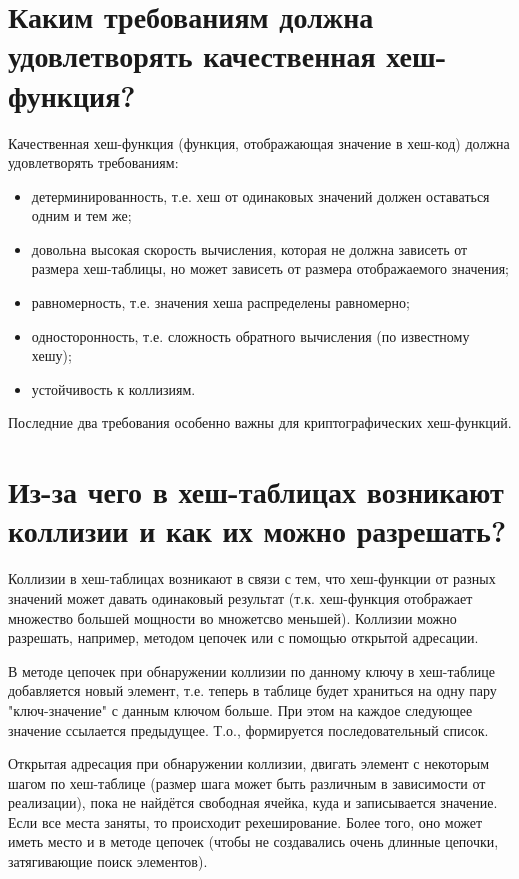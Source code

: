 \documentclass[a4paper,12pt]{article}	%
\begin{document}
\section{Каким требованиям должна удовлетворять качественная хеш-функция?}

	Качественная хеш-функция (функция, отображающая значение в хеш-код) должна удовлетворять требованиям:
	
	\begin{itemize}
	
		\item детерминированность, т.е. хеш от одинаковых значений должен оставаться одним и тем же;
		
		\item довольна высокая скорость вычисления, которая не должна зависеть от размера хеш-таблицы, но может зависеть от размера отображаемого значения;
		
		\item равномерность, т.е. значения хеша распределены равномерно;
		
		\item односторонность, т.е. сложность обратного вычисления (по известному хешу);
		
		\item устойчивость к коллизиям.
	
	\end{itemize}
	
	Последние два требования особенно важны для криптографических хеш-функций.

\section{Из-за чего в хеш-таблицах возникают коллизии и как их можно разрешать?}

	Коллизии в хеш-таблицах возникают в связи с тем, что хеш-функции от разных значений может давать одинаковый результат (т.к. хеш-функция отображает множество большей мощности во множетсво меньшей). Коллизии можно разрешать, например, методом цепочек или с помощью открытой адресации.
	
	В методе цепочек при обнаружении коллизии по данному ключу в хеш-таблице добавляется новый элемент, т.е. теперь в таблице будет храниться на одну пару "ключ-значение" с данным ключом больше. При этом на каждое следующее значение ссылается предыдущее. Т.о., формируется последовательный список.
	
	Открытая адресация при обнаружении коллизии, двигать элемент с некоторым шагом по хеш-таблице (размер шага может быть различным в зависимости от реализации), пока не найдётся свободная ячейка, куда и записывается значение. Если все места заняты, то происходит рехеширование. Более того, оно может иметь место и в методе цепочек (чтобы не создавались очень длинные цепочки, затягивающие поиск элементов).
\end{document}
